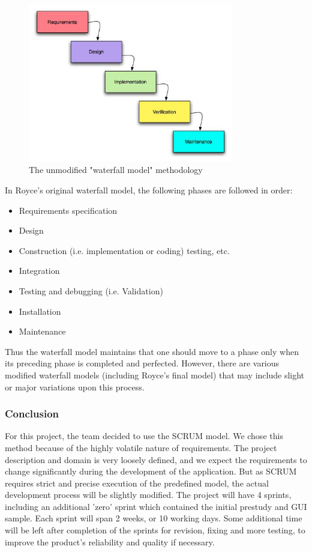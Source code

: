 \begin{figure}[htb]
	\centering
	\includegraphics[width=0.8\textwidth]{prestudy/development_process/waterfall.jpg}
	\caption{The unmodified "waterfall model" methodology\cite{worldpress:waterfall}}
	\label{fig:waterfall-model}
\end{figure}

In Royce's original waterfall model, the following phases are followed in order:

\begin{itemize}
	\item Requirements specification
	\item Design
	\item Construction (i.e. implementation or coding) testing, etc.
	\item Integration
	\item Testing and debugging (i.e. Validation)
	\item Installation
	\item Maintenance
\end{itemize}

Thus the waterfall model maintains that one should move to a phase only when its preceding phase is
completed and perfected. However, there are various modified waterfall models (including Royce's final model)
that may include slight or major variations upon this process.

\subsubsection{Conclusion}
For this project, the team decided to use the SCRUM model. We chose this method because of the highly volatile nature
of requirements. The project description and domain is very loosely defined,
and we expect the requirements to change significantly during the development
of the application. But as SCRUM requires strict and precise
execution of the predefined model, the actual development process will be slightly modified.
The project will have 4 sprints, including an additional 'zero' sprint which contained the initial
prestudy and GUI sample. Each sprint will span 2 weeks, or 10 working days.
Some additional time will be left after completion of the sprints for revision,
fixing and more testing, to improve the product's reliability and quality if necessary.
